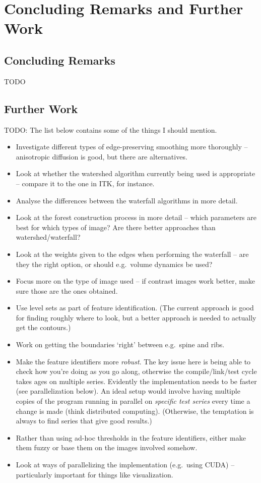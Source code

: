 \chapter{Concluding Remarks and Further Work}
\label{chap:conclusions}

\section{Concluding Remarks}

TODO

\section{Further Work}

\iffalse

TODO: The list below contains some of the things I should mention.
%
\begin{itemize}
\item Investigate different types of edge-preserving smoothing more thoroughly -- anisotropic diffusion is good, but there are alternatives.
\item Look at whether the watershed algorithm currently being used is appropriate -- compare it to the one in ITK, for instance.
\item Analyse the differences between the waterfall algorithms in more detail.
\item Look at the forest construction process in more detail -- which parameters are best for which types of image? Are there better approaches than watershed/waterfall?
\item Look at the weights given to the edges when performing the waterfall -- are they the right option, or should e.g.~volume dynamics be used?
\item Focus more on the type of image used -- if contrast images work better, make sure those are the ones obtained.
\item Use level sets as part of feature identification. (The current approach is good for finding roughly where to look, but a better approach is needed to actually get the contours.)
\item Work on getting the boundaries `right' between e.g.~spine and ribs.
\item Make the feature identifiers more \emph{robust}. The key issue here is being able to check how you're doing as you go along, otherwise the compile/link/test cycle takes ages on multiple series. Evidently the implementation needs to be faster (see parallelization below). An ideal setup would involve having multiple copies of the program running in parallel on \emph{specific test series} every time a change is made (think distributed computing). (Otherwise, the temptation is always to find series that give good results.)
\item Rather than using ad-hoc thresholds in the feature identifiers, either make them fuzzy or base them on the images involved somehow.
\item Look at ways of parallelizing the implementation (e.g.~using CUDA) -- particularly important for things like visualization.
\end{itemize}

